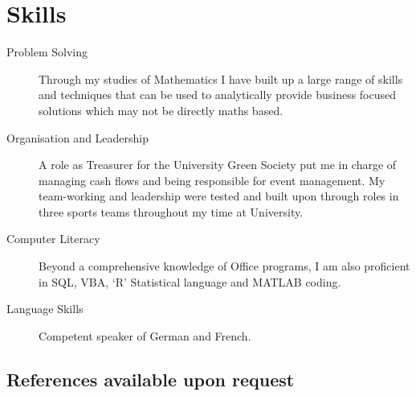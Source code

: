 \documentclass[10pt]{article}
\begin{document}
\section*{Skills}
\begin{description}
\item[Problem Solving] Through my studies of Mathematics I have built up a large range of skills and techniques that can be used to analytically provide business focused solutions which may not be directly maths based.
\item[Organisation and Leadership]A role as Treasurer for the University Green Society put me in charge of managing cash flows and being responsible for event management. My team-working and leadership were tested and built upon through roles in three sports teams throughout my time at University.
\item[Computer Literacy] Beyond a comprehensive knowledge of Office programs, I am also proficient in SQL, VBA, `R' Statistical language and MATLAB coding.
\item[Language Skills] Competent speaker of German and French.
\end{description}

\subsection*{References available upon request}
\end{document}
